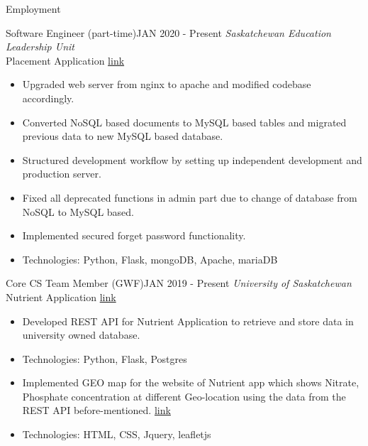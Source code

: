 \documentclass[]{mcdowellcv}
\begin{document}
	\begin{cvsection}{Employment}
	
	    \begin{cvsubsection}{Software Engineer (part-time)}{}{JAN 2020 - Present}
	    \emph{Saskatchewan Education Leadership Unit}\\
	    Placement Application \href{https://placement.usask.ca}{link}
    	    \begin{itemize}
    	        \item Upgraded web server from nginx to apache and modified codebase accordingly.
    	        \item Converted NoSQL based documents to MySQL based tables and migrated previous data to new MySQL based database.
    	        \item Structured development workflow by setting up independent development and production server.
    	        \item Fixed all deprecated functions in admin part due to change of database from NoSQL to MySQL based.
    	        \item Implemented secured forget password functionality.
    	        \item Technologies: Python, Flask, mongoDB, Apache, mariaDB
    	         
    	        
    	    \end{itemize}
    	
    	\end{cvsubsection}
    	
    		\begin{cvsubsection}{Core CS Team Member (GWF)}{}{JAN 2019 - Present}
    		\emph{University of Saskatchewan}\\
    		Nutrient Application \href{https://gwf.usask.ca/projects-facilities/nutrient-app.php#Overview}{ link }
    	    \begin{itemize}
    	        \item Developed REST API for 
    	        Nutrient Application to retrieve and store data in university owned database. 
    	        \item Technologies: Python, Flask, Postgres
    	        \item Implemented GEO map for the website of Nutrient app which shows Nitrate, Phosphate concentration at different Geo-location using the data from the REST API before-mentioned. \href{https://gwf.usask.ca/projects-facilities/nutrient-app.php#ViewYourMeasurements}{link}
    	        \item Technologies: HTML, CSS, Jquery, leafletjs
    	        

\end{itemize}
\end{cvsubsection}
\end{cvsection}
\end{document}
